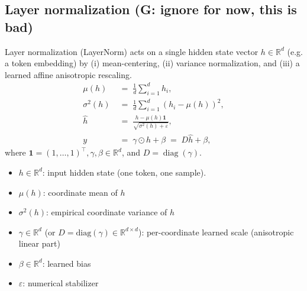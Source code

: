 \documentclass[a4paper,12pt]{article}
\begin{document}
\subsection{Layer normalization (G: ignore for now, this is bad)}\label{subsec:layer_norm}%

Layer normalization (LayerNorm) acts on a single hidden state vector \(h\in\mathbb{R}^d\) (e.g. a token embedding) by (i) mean-centering, (ii) variance normalization, and (iii) a learned affine anisotropic rescaling.
\begin{align}
\mu(h) &\;=\; \frac{1}{d}\sum_{i=1}^d h_i, \\
\sigma^2(h) &\;=\; \frac{1}{d}\sum_{i=1}^d (h_i-\mu(h))^2, \\
\widehat{h} &\;=\; \frac{h - \mu(h)\mathbf{1}}{\sqrt{\sigma^2(h)+\varepsilon}}, \label{eq:ln_norm}\\
y &\;=\; \gamma \odot \widehat{h} + \beta \;=\; D\widehat{h} + \beta, \label{eq:ln_affine}
\end{align}
where \(\mathbf{1}=(1,\dots,1)^\top , \gamma, \beta \in\mathbb{R}^d\), and \(D=\operatorname{diag}(\gamma)\).


\begin{itemize}
  \item \(h\in\mathbb{R}^d\): input hidden state (one token, one sample).
  \item \(\mu(h)\): coordinate mean of \(h\)
  \item \(\sigma^2(h)\): empirical coordinate variance of \(h\)
  \item \(\gamma\in\mathbb{R}^d\) (or \(D=\mathrm{diag}(\gamma)\in\mathbb{R}^{d\times d}\)): per-coordinate learned scale (anisotropic linear part)
  \item \(\beta\in\mathbb{R}^d\): learned bias
  \item \(\varepsilon\): numerical stabilizer
\end{itemize}
\end{document}
